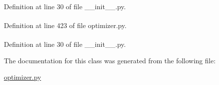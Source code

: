 \-Definition at line 30 of file \-\_\-\-\_\-init\-\_\-\-\_\-.\-py.

\hypertarget{classforcebalance_1_1optimizer_1_1Optimizer_a145e90c7776604285424a54ed484d651}{
\paragraph[{\-Val}]{}}\label{classforcebalance_1_1optimizer_1_1Optimizer_a145e90c7776604285424a54ed484d651}


\-Definition at line 423 of file optimizer.\-py.

\hypertarget{classforcebalance_1_1BaseClass_afd68efa29ccd2f320f4cf82198214aac}{
\paragraph[{verbose\-\_\-options}]{}}\label{classforcebalance_1_1BaseClass_afd68efa29ccd2f320f4cf82198214aac}


\-Definition at line 30 of file \-\_\-\-\_\-init\-\_\-\-\_\-.\-py.



\-The documentation for this class was generated from the following file\-:\begin{DoxyCompactItemize}
\item 
\hyperlink{optimizer_8py}{optimizer.\-py}\end{DoxyCompactItemize}
